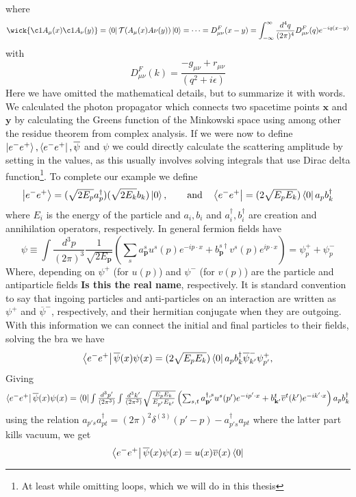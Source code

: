\documentclass[12pt, a4paper]{book}
\begin{document}
where 
$$
\wick{\c1A_\mu(x)\c1A_\nu(y)} = \bra{0}\mathcal{T}(A_\mu(x)A\nu(y))\ket{0} = \cdots = D_{\mu\nu}^F(x-y) = \int_{-\infty}^{\infty}\frac{d^4q}{(2\pi)^4}D_{\mu\nu}^F(q)e^{-iq(x-y)}
$$
with
\begin{equation}\label{eq:p-prop}
    D_{\mu\nu}^F(k) = \frac{-g_{\mu\nu}+r_{\mu\nu}}{(q^2+i\epsilon)}
\end{equation}
Here we have omitted the mathematical details, but to summarize it with words. We calculated the photon propagator which connects two spacetime points $\mathbf{x}$ and $\mathbf{y}$ by calculating the Greens function of the Minkowski space using among other the residue theorem from complex analysis. 
If we were now to define $\ket{e^-e^+}, \bra{e^-e^+}, \overline{\psi}$ and $\psi$ we could directly calculate the scattering amplitude by setting in the values, as this usually involves solving integrals that use Dirac delta function\footnote{At least while omitting loops, which we will do in this thesis}. 
To complete our example we define
$$
\ket{e^-e^+} = (\sqrt{2E_p}a^\dagger_{p})(\sqrt{2E_k}b_{k})\ket{0},\qquad\text{and}\quad \bra{e^-e^+} = (2\sqrt{E_pE_k})\bra{0}a_{p}b^\dagger_{k}
$$
where $E_i$ is the energy of the particle and $a_i,b_i$ and $a^\dagger_i,b^\dagger_i$ are creation and annihilation operators, respectively. In general fermion fields have
$$
\psi \equiv\int\frac{d^3p}{(2\pi)^3}\frac{1}{\sqrt{2E_\mathbf{p}}}\left(\sum_sa^s_\mathbf{p}u^s(p)e^{-ip\cdot x}+b^{s\dagger}_\mathbf{p}v^s(p)e^{ip\cdot x}\right) =\psi^+_p+\psi^-_p
$$
Where, depending on $\psi^+$ (for $u(p)$) and $\psi^-$ (for $v(p)$) are the particle and antiparticle fields \textbf{Is this the real name}, respectively. It is standard convention to say that ingoing particles and anti-particles 
on an interaction are written as $\psi^+$ and $\overline{\psi}^-$, respectively, and their hermitian conjugate when they are outgoing. With this information we can connect the initial and final particles to their fields, solving the bra we have
$$
\bra{e^-e^+}\overline{\psi}(x)\psi(x) = (2\sqrt{E_pE_k})\bra{0}a_{p}b^\dagger_{k}\overline{\psi}^-_{k'}\psi^+_{p'},
$$
Giving
$$
\textstyle\bra{e^-e^+}\overline{\psi}(x)\psi(x) = \bra{0} \int\frac{d^3p'}{(2\pi^3)}\int\frac{d^3k'}{(2\pi^3)}\sqrt{\frac{E_pE_k}{E_{p'}E_{k'}}} \left(\sum_{s,t}a^{\dagger,s}_\mathbf{p'}u^s(p')e^{-ip'\cdot x} + b^{t}_\mathbf{k'}\overline{v}^t(k')e^{-ik'\cdot x}\right)a_{p}b^\dagger_{k}
$$
using the relation $a_{p's}a_{pt}^\dagger = (2\pi)^2\delta^{(3)}(p'-p)- a_{p's}^\dagger a_{pt}$ where the latter part kills vacuum, we get
$$
\bra{e^-e^+}\overline{\psi}(x)\psi(x) = u(x)\overline{v}(x)\bra{0}
$$
\end{document}
